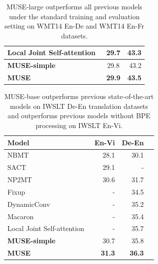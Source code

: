 \documentclass{article} %
\begin{document}
\begin{table}
\begin{tabular}{lcr}
Local Joint Self-attention~\citep{fonollosa2019joint} &29.7  & 43.3 \\
\midrule
\textbf{MUSE-simple} & 29.8 & 43.2 \\
\textbf{MUSE}  & \textbf{29.9} & \textbf{43.5} \\
\bottomrule
\end{tabular}
\caption{MUSE-large outperforms all previous models under the standard training and evaluation setting on WMT14 En-De and WMT14 En-Fr datasets.}
\label{tab:enfr}
\vspace{-0.2cm}
\end{table}

\begin{table}[t]
\centering
\begin{tabular}{lrrr}
\toprule
Model  & En-Vi & De-En  \\
\midrule
NBMT~\citep{NBMT} & 28.1 & 30.1  \\
SACT~\citep{SACT} & 29.1 &-  \\
NP2MT~\citep{feng2018neural} &30.6 & 31.7 \\ %
Fixup~\citep{zhang2019fixup}  & -  & 34.5\\
DynamicConv~\citep{wu2019pay}  & - & 35.2 \\
Macaron~\citep{lu2019understanding}  & - &35.4 \\ 
Local Joint Self-attention~\citep{fonollosa2019joint}  &- &35.7 \\
\midrule
\textbf{MUSE-simple} & 30.7 & 35.8 \\
\textbf{MUSE} &\textbf{31.3} &\textbf{36.3}\\
\bottomrule
\end{tabular}
\caption{MUSE-base outperforms previous state-of-the-art models on IWSLT  De-En translation datasets and outperforms previous models without BPE processing on IWSLT  En-Vi. }
\label{tab:mtsmall}
\end{table}
\end{document}
